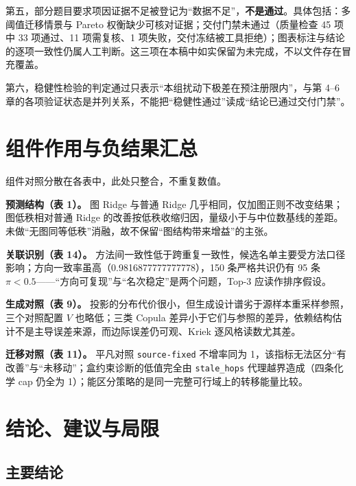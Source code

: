 \documentclass[11pt,a4paper]{article}
\begin{document}
第五，部分题目要求项因证据不足被登记为``数据不足''，\textbf{不是通过}。具体包括：多阈值迁移情景与
Pareto 权衡缺少可核对证据；交付门禁未通过（质量检查 45 项中 33
项通过、11 项需复核、1
项失败，交付冻结被工具拒绝）；图表标注与结论的逐项一致性仍属人工判断。这三项在本稿中如实保留为未完成，不以文件存在冒充覆盖。

第六，稳健性检验的判定通过只表示``本组扰动下极差在预注册限内''，与第
4--6
章的各项验证状态是并列关系，不能把``稳健性通过''读成``结论已通过交付门禁''。

\section{组件作用与负结果汇总}\label{ux7ec4ux4ef6ux4f5cux7528ux4e0eux8d1fux7ed3ux679cux6c47ux603b}

组件对照分散在各表中，此处只整合，不重复数值。

\textbf{预测结构（表 1）。} 图 Ridge 与普通 Ridge
几乎相同，仅加图正则不改变结果；图低秩相对普通 Ridge
的改善按低秩收缩归因，量级小于与中位数基线的差距。未做``无图同等低秩''消融，故不保留``图结构带来增益''的主张。

\textbf{关联识别（表 14）。}
方法间一致性低于跨重复一致性，候选名单主要受方法口径影响；方向一致率虽高（0.9816877777777778），150
条严格共识仍有 95 条
\(\pi<0.5\)------``方向可复现''与``名次稳定''是两个问题，Top-3
应读作排序假设。

\textbf{生成对照（表 9）。}
投影的分布代价很小，但生成设计谱劣于源样本重采样参照，三个对照配置 \(V\)
也略低；三类 Copula
差异小于它们与参照的差异，依赖结构估计不是主导误差来源，而边际误差仍可观、Kriek
逐风格读数尤其差。

\textbf{迁移对照（表 11）。} 平凡对照 \texttt{source-fixed} 不增率同为
1，该指标无法区分``有改善''与``未移动''；盒约束诊断的低值完全由
\texttt{stale\_hops} 代理越界造成（四条化学 cap 仍全为
1）；能区分策略的是同一完整可行域上的转移能量比较。

\section{结论、建议与局限}\label{ux7ed3ux8bbaux5efaux8baeux4e0eux5c40ux9650}

\subsection{主要结论}\label{ux4e3bux8981ux7ed3ux8bba}
\end{document}
